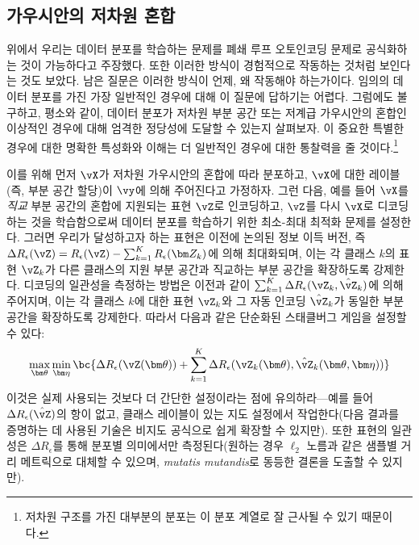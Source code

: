 \documentclass[../../book-main_ko.tex]{subfiles}
\begin{document}
\subsection{가우시안의 저차원 혼합}

위에서 우리는 데이터 분포를 학습하는 문제를 폐쇄 루프 오토인코딩 문제로 공식화하는 것이 가능하다고 주장했다. 또한 이러한 방식이 경험적으로 작동하는 것처럼 보인다는 것도 보았다. 남은 질문은 이러한 방식이 언제, 왜 작동해야 하는가이다. 임의의 데이터 분포를 가진 가장 일반적인 경우에 대해 이 질문에 답하기는 어렵다. 그럼에도 불구하고, 평소와 같이, 데이터 분포가 저차원 부분 공간 또는 저계급 가우시안의 혼합인 이상적인 경우에 대해 엄격한 정당성에 도달할 수 있는지 살펴보자. 이 중요한 특별한 경우에 대한 명확한 특성화와 이해는 더 일반적인 경우에 대한 통찰력을 줄 것이다.\footnote{저차원 구조를 가진 대부분의 분포는 이 분포 계열로 잘 근사될 수 있기 때문이다.} 

이를 위해 먼저 $\vX$가 저차원 가우시안의 혼합에 따라 분포하고, $\vX$에 대한 레이블(즉, 부분 공간 할당)이 $\vy$에 의해 주어진다고 가정하자. 그런 다음, 예를 들어 $\vX$를 \textit{직교} 부분 공간의 혼합에 지원되는 표현 $\vZ$로 인코딩하고, $\vZ$를 다시 $\vX$로 디코딩하는 것을 학습함으로써 데이터 분포를 학습하기 위한 최소-최대 최적화 문제를 설정한다. 그러면 우리가 달성하고자 하는 표현은 이전에 논의된 정보 이득 버전, 즉 $ \Delta R_{\epsilon}(\vZ) = R_{\epsilon}(\vZ) - \sum_{k=1}^K R_{\epsilon}(\bm Z_k)$에 의해 최대화되며, 이는 각 클래스 $k$의 표현 $\vZ_{k}$가 다른 클래스의 지원 부분 공간과 직교하는 부분 공간을 확장하도록 강제한다. 디코딩의 일관성을 측정하는 방법은 이전과 같이 $\sum_{k = 1}^{K}\Delta R_\epsilon(\vZ_{k}, \hat{\vZ}_{k})$에 의해 주어지며, 이는 각 클래스 $k$에 대한 표현 $\vZ_{k}$와 그 자동 인코딩 $\hat{\vZ}_{k}$가 동일한 부분 공간을 확장하도록 강제한다. 따라서 다음과 같은 단순화된 스태클버그 게임을 설정할 수 있다:
\begin{equation}\label{eq:ctrl_msp_game}
    \max_{\bm \theta}\min_{\bm \eta}\bc{\Delta R_\epsilon(\vZ(\bm \theta)) + \sum_{k = 1}^{K}\Delta R_\epsilon(\vZ_{k}(\bm \theta), \hat{\vZ}_{k}(\bm \theta, \bm \eta))}
\end{equation}
이것은 실제 사용되는 것보다 더 간단한 설정이라는 점에 유의하라---예를 들어 \(\Delta R_\epsilon(\hat{\vZ})\)의 항이 없고, 클래스 레이블이 있는 지도 설정에서 작업한다(다음 결과를 증명하는 데 사용된 기술은 비지도 공식으로 쉽게 확장할 수 있지만). 또한 표현의 일관성은 \(\Delta R_\epsilon\)를 통해 분포별 의미에서만 측정된다(원하는 경우 $\ell_{2}$ 노름과 같은 샘플별 거리 메트릭으로 대체할 수 있으며, \textit{mutatis mutandis}로 동등한 결론을 도출할 수 있지만).
\end{document}
